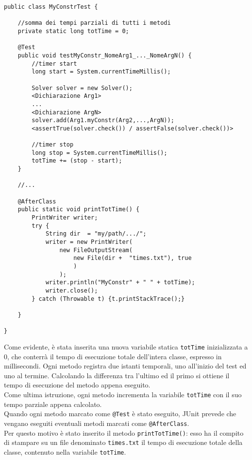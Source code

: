 \begin{lstlisting}
public class MyConstrTest {
	
    //somma dei tempi parziali di tutti i metodi
    private static long totTime = 0;

    @Test
    public void testMyConstr_NomeArg1_..._NomeArgN() {
        //timer start
        long start = System.currentTimeMillis();
		
        Solver solver = new Solver();
        <Dichiarazione Arg1>
        ...
        <Dichiarazione ArgN>    
        solver.add(Arg1.myConstr(Arg2,...,ArgN));    
        <assertTrue(solver.check()) / assertFalse(solver.check())>
        
        //timer stop
        long stop = System.currentTimeMillis();
        totTime += (stop - start);
    }
    
    //...
    
    @AfterClass
    public static void printTotTime() {
        PrintWriter writer;
        try {
            String dir  = "my/path/.../";
            writer = new PrintWriter(
                new FileOutputStream(
                    new File(dir +  "times.txt"), true
                    )
                );
            writer.println("MyConstr" + " " + totTime);
            writer.close();
        } catch (Throwable t) {t.printStackTrace();}

    }
    
}
\end{lstlisting}

Come evidente, è stata inserita una nuova variabile statica \texttt{totTime} inizializzata a $0$, che conterrà il tempo di esecuzione totale dell'intera classe, espresso in millisecondi. Ogni metodo registra due istanti temporali, uno all'inizio del test ed uno al termine. Calcolando la differenza tra l'ultimo ed il primo si ottiene il tempo di esecuzione del metodo appena eseguito.\\
Come ultima istruzione, ogni metodo incrementa la variabile \texttt{totTime} con il suo tempo parziale appena calcolato. \\

Quando ogni metodo marcato come \texttt{@Test} è stato eseguito, JUnit prevede che vengano eseguiti eventuali metodi marcati come \texttt{@AfterClass}.\\
Per questo motivo è stato inserito il metodo \texttt{printTotTime()}: esso ha il compito di stampare su un file denominato \texttt{times.txt} il tempo di esecuzione totale della classe, contenuto nella variabile \texttt{totTime}.\\

